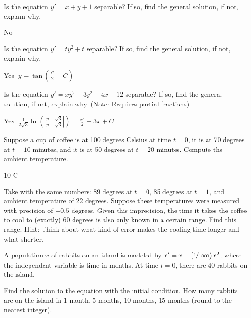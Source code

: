 \begin{exercise}
Is the equation $y' = x+y+1$ separable? If so, find the general solution, if not, explain why.
\end{exercise}
\comboSol{%
}
{%
No
}

\begin{exercise}
Is the equation $y' = ty^2 + t$ separable? If so, find the general solution, if not, explain why.
\end{exercise}
\comboSol{%
}
{%
Yes. $y = \tan\left(\frac{t^2}{2} + C\right)$
}

\begin{exercise}
Is the equation $y' = xy^2 + 3y^2 - 4x - 12$ separable? If so, find the general solution, if not, explain why. (Note: Requires partial fractions)
\end{exercise}
\comboSol{%
}
{%
Yes. $\frac{1}{2\sqrt{3}}\ln\left(\left| \frac{y - \sqrt{3}}{y+\sqrt{3}}\right|\right) = \frac{x^2}{2} + 3x + C$
}

\begin{exercise}
Suppose a cup of coffee is at 100 degrees Celsius at time $t=0$,
it is at 70 degrees at $t=10$ minutes, and it is at 50 degrees at $t=20$
minutes.  Compute the ambient temperature.
\end{exercise}
\comboSol{%
}
{%
10 C
}

\begin{exercise}\ansMark%
Take  with the same numbers: 89 degrees at
$t=0$, 85 degrees at $t=1$, and ambient temperature
of 22 degrees.  Suppose these temperatures were measured with precision of
$\pm 0.5$ degrees.  Given this imprecision, the time
it takes the coffee to cool to (exactly) 60 degrees is also only known in a
certain range.  Find this range.  Hint: Think about what kind of error makes
the cooling time longer and what shorter.
\end{exercise}

\begin{exercise}\ansMark%
A population $x$ of rabbits on an island is modeled by
$x' = x- \bigl(\nicefrac{1}{1000} \bigr) x^2$, where the independent
variable is time in months.  At time $t=0$, there are 40 rabbits
on the island.
\begin{tasks}
\task Find the solution to the equation with the initial
condition.
\task
How many rabbits are on the island in 1 month, 5 months, 
10 months, 15 months (round to the nearest integer).
\end{tasks}
\end{exercise}

\setcounter{exercise}{100}


